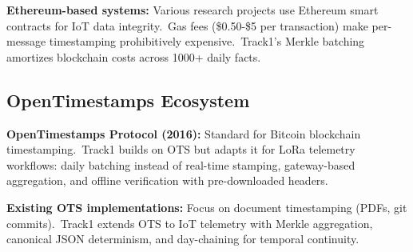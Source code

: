 \textbf{Ethereum-based systems:} Various research projects use Ethereum smart contracts for IoT data integrity.\ Gas fees (\$0.50-\$5 per transaction) make per-message timestamping prohibitively expensive.\ Track1's Merkle batching amortizes blockchain costs across 1000+ daily facts.

\subsection{OpenTimestamps Ecosystem}

\textbf{OpenTimestamps Protocol (2016):} Standard for Bitcoin blockchain timestamping.\ Track1 builds on OTS but adapts it for LoRa telemetry workflows: daily batching instead of real-time stamping, gateway-based aggregation, and offline verification with pre-downloaded headers.

\textbf{Existing OTS implementations:} Focus on document timestamping (PDFs, git commits).\ Track1 extends OTS to IoT telemetry with Merkle aggregation, canonical JSON determinism, and day-chaining for temporal continuity.

\usetikzlibrary{arrows.meta,positioning,fit,shapes.geometric}

